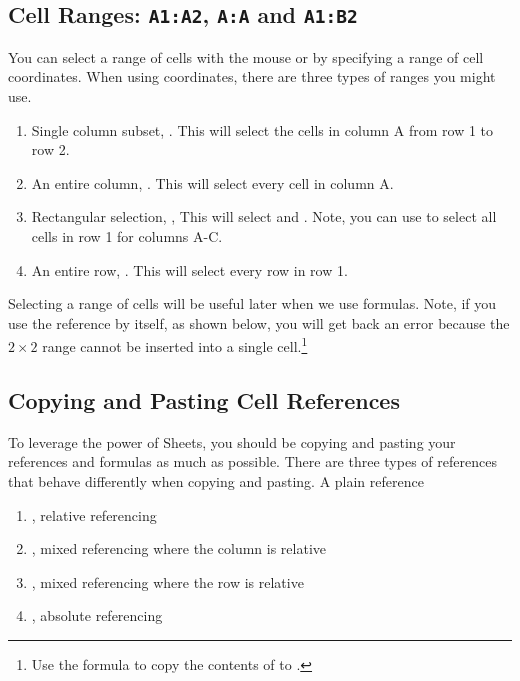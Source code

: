 \subsection{Cell Ranges: \texttt{A1:A2}, \texttt{A:A} and \texttt{A1:B2}}

You can select a range of cells with the mouse or by specifying a range of cell coordinates. When using coordinates, there are three types of ranges you might use. 

\begin{enumerate}
    \item Single column subset, . This will select the cells in column A from row 1 to row 2.
    \item An entire column, . This will select every cell in column A. 
    \item Rectangular selection, , This will select  and . Note, you can use  to select all cells in row 1 for columns A-C.
    \item An entire row, . This will select every row in row 1. 
\end{enumerate}

Selecting a range of cells will be useful later when we use formulas. Note, if you use the reference  by itself, as shown below, you will get back an error because the $2\times 2$ range cannot be inserted into a single cell.\footnote{Use the formula  to copy the contents of  to .}
\begin{center}
\end{center}

\subsection{Copying and Pasting Cell References}

To leverage the power of Sheets, you should be copying and pasting your references and formulas as much as possible. There are three types of references that behave differently when copying and pasting. A plain  reference 

\begin{enumerate}
    \item {}, relative referencing
    \item {}, mixed referencing where the column is relative
    \item {}, mixed referencing where the row is relative
    \item {}, absolute referencing
\end{enumerate}

